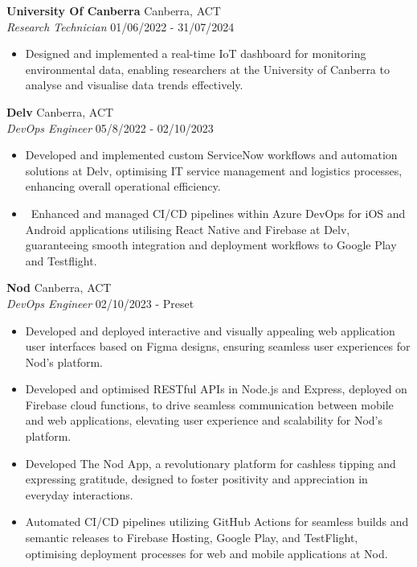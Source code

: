 \documentclass[a4paper]{article}
\begin{document}
      \textbf{University Of Canberra} \hfill Canberra, ACT\\
          \textit{Research Technician} \hfill 01/06/2022 - 31/07/2024\\
          \vspace{-1mm}
\begin{itemize} \itemsep 1pt
      \item Designed and implemented a real-time IoT dashboard for monitoring environmental data, enabling researchers at the University of Canberra to analyse and visualise data trends effectively.
\end{itemize}
      \textbf{Delv} \hfill Canberra, ACT\\
          \textit{DevOps Engineer} \hfill 05/8/2022 - 02/10/2023\\
          \vspace{-1mm}
      \begin{itemize} \itemsep 1pt
            \item Developed and implemented custom ServiceNow workflows and automation solutions at Delv, optimising IT service management and logistics processes, enhancing overall operational efficiency.
            \item {\
}Enhanced and managed CI/CD pipelines within Azure DevOps for iOS and Android applications utilising React Native and Firebase at Delv, guaranteeing smooth integration and deployment workflows to Google Play and Testflight.
      \end{itemize}
      \textbf{Nod} \hfill Canberra, ACT\\
          \textit{DevOps Engineer} \hfill 02/10/2023 - Preset\\
          \vspace{-1mm}
\begin{itemize} \itemsep 1pt
      \item Developed and deployed interactive and visually appealing web application user interfaces based on Figma designs, ensuring seamless user experiences for Nod's platform.
      \item Developed and optimised RESTful APIs in Node.js and Express, deployed on Firebase cloud functions, to drive seamless communication between mobile and web applications, elevating user experience and scalability for Nod's platform.
      \item Developed The Nod App, a revolutionary platform for cashless tipping and expressing gratitude, designed to foster positivity and appreciation in everyday interactions.
      \item Automated CI/CD pipelines utilizing GitHub Actions for seamless builds and semantic releases to Firebase Hosting, Google Play, and TestFlight, optimising deployment processes for web and mobile applications at Nod.
\end{itemize}
\end{document}
